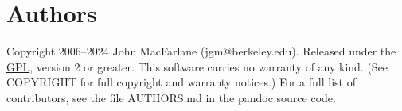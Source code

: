 \documentclass[
  b5paper
]{book}
\begin{document}
\chapter{Authors}\label{authors}

Copyright 2006--2024 John MacFarlane (jgm@berkeley.edu). Released under
the \href{https://www.gnu.org/copyleft/gpl.html}{GPL}, version 2 or
greater. This software carries no warranty of any kind. (See COPYRIGHT
for full copyright and warranty notices.) For a full list of
contributors, see the file AUTHORS.md in the pandoc source code.
\end{document}
